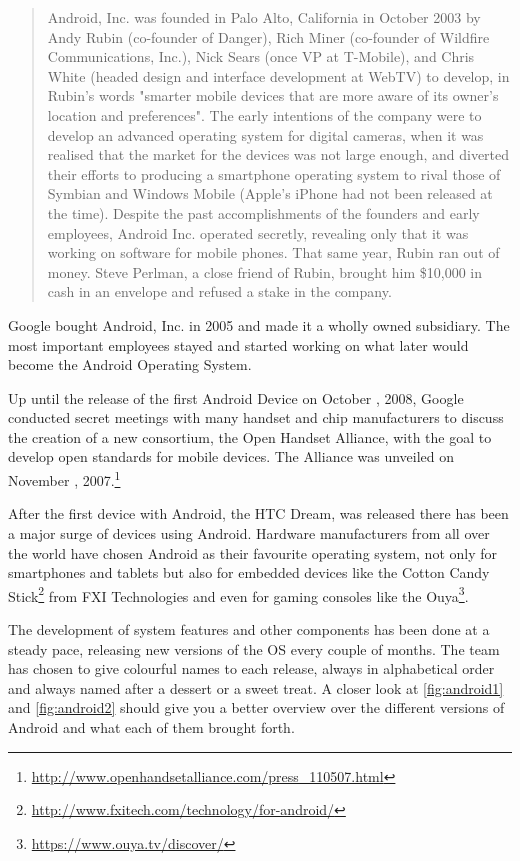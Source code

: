 \begin{quotation}
Android, Inc. was founded in Palo Alto, California in October 2003 by Andy Rubin (co-founder of Danger), Rich Miner (co-founder of Wildfire Communications, Inc.), Nick Sears (once VP at T-Mobile), and Chris White (headed design and interface development at WebTV) to develop, in Rubin's words "smarter mobile devices that are more aware of its owner's location and preferences". The early intentions of the company were to develop an advanced operating system for digital cameras, when it was realised that the market for the devices was not large enough, and diverted their efforts to producing a smartphone operating system to rival those of Symbian and Windows Mobile (Apple's iPhone had not been released at the time). Despite the past accomplishments of the founders and early employees, Android Inc. operated secretly, revealing only that it was working on software for mobile phones. That same year, Rubin ran out of money. Steve Perlman, a close friend of Rubin, brought him \$10,000 in cash in an envelope and refused a stake in the company.
\cite{wikipedia:android}
\end{quotation}

Google bought Android, Inc. in 2005 and made it a wholly owned subsidiary. The most important employees stayed and started working on what later would become the Android Operating System.

Up until the release of the first Android Device on October , 2008, Google conducted secret meetings with many handset and chip manufacturers to discuss the creation of a new consortium, the Open Handset Alliance, with the goal to develop open standards for mobile devices. The Alliance was unveiled on November , 2007.\footnote{\url{http://www.openhandsetalliance.com/press_110507.html}}


After the first device with Android, the HTC Dream, was released there has been a major surge of devices using Android. Hardware manufacturers from all over the world have chosen Android as their favourite operating system, not only for smartphones and tablets but also for embedded devices like the Cotton Candy Stick\footnote{\url{http://www.fxitech.com/technology/for-android/}} from FXI Technologies and even for gaming consoles like the Ouya\footnote{\url{https://www.ouya.tv/discover/}}. %


The development of system features and other components has been done at a steady pace, releasing new versions of the OS every couple of months. The team has chosen to give colourful names to each release, always in alphabetical order and always named after a dessert or a sweet treat. A closer look at \autoref{fig:android1} and \autoref{fig:android2} should give you a better overview over the different versions of Android and what each of them brought forth.   

